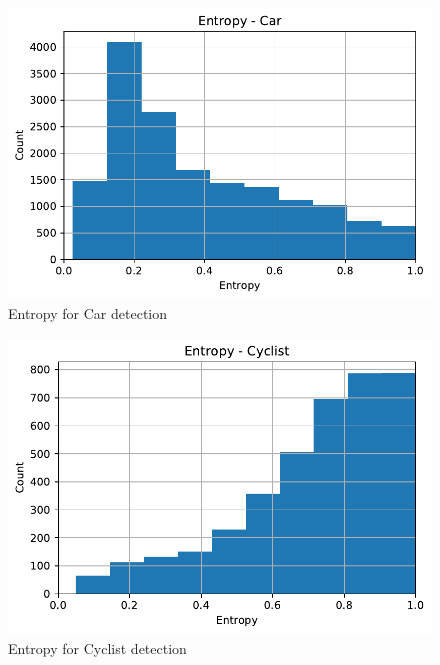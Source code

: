 \documentclass[10pt,twocolumn,letterpaper]{article}
\begin{document}
\begin{figure}[!htbp]
        \centering
		\includegraphics[scale = 0.4]{images/Part-Bayesian F_Pointnet_Results/Entropy_Car.pdf}
        \caption[Extracted frustum point cloud after Normalization]{Entropy for Car detection}
        \label{fig:Norm Point Cloud}
\end{figure}
\begin{figure}[!htbp]
        \centering
		\includegraphics[scale = 0.4]{images/Part-Bayesian F_Pointnet_Results/Entropy_Cyclist.pdf}
        \caption[Extracted frustum point cloud after Normalization]{Entropy for Cyclist detection}
        \label{fig:Norm Point Cloud}
\end{figure}
\end{document}
